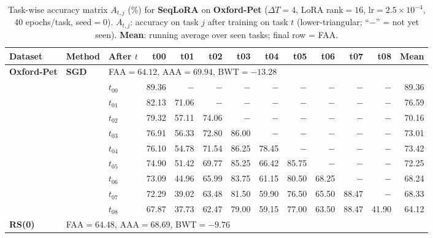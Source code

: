 
\begin{table}[ht]
\centering
\caption{%
  Task-wise accuracy matrix $A_{t,j}$ (\%) for \textbf{SeqLoRA} on \textbf{Oxford-Pet} ($\Delta T=4$, LoRA rank$=16$, lr$=2.5\times10^{-4}$, 40 epochs/task, seed$=0$).
  $A_{t,j}$: accuracy on task $j$ after training on task $t$  (lower-triangular; ``$-$'' = not yet seen).
  \textbf{Mean}: running average over seen tasks; final row = FAA.
}
\label{tab:raw_seqlora_pets}
\setlength{\tabcolsep}{2.8pt}
\renewcommand{\arraystretch}{0.88}
\scriptsize
\begin{tabular}{@{}l l l *{10}{r}@{}}
\toprule
\textbf{Dataset} & \textbf{Method} & \textbf{After $t$} & \textbf{t00} & \textbf{t01} & \textbf{t02} & \textbf{t03} & \textbf{t04} & \textbf{t05} & \textbf{t06} & \textbf{t07} & \textbf{t08} & \textbf{Mean} \\
\midrule
\multirow{10}{*}{\textbf{Oxford-Pet}} & \multirow{10}{*}{\textbf{SGD}} & \multicolumn{11}{l}{\quad\small FAA$=64.12$,\; AAA$=69.94$,\; BWT$=-13.28$} \\
 & & $t_{00}$ & 89.36 & $-$ & $-$ & $-$ & $-$ & $-$ & $-$ & $-$ & $-$ & 89.36 \\
 & & $t_{01}$ & 82.13 & 71.06 & $-$ & $-$ & $-$ & $-$ & $-$ & $-$ & $-$ & 76.59 \\
 & & $t_{02}$ & 79.32 & 57.11 & 74.06 & $-$ & $-$ & $-$ & $-$ & $-$ & $-$ & 70.16 \\
 & & $t_{03}$ & 76.91 & 56.33 & 72.80 & 86.00 & $-$ & $-$ & $-$ & $-$ & $-$ & 73.01 \\
 & & $t_{04}$ & 76.10 & 54.78 & 71.54 & 86.25 & 78.45 & $-$ & $-$ & $-$ & $-$ & 73.42 \\
 & & $t_{05}$ & 74.90 & 51.42 & 69.77 & 85.25 & 66.42 & 85.75 & $-$ & $-$ & $-$ & 72.25 \\
 & & $t_{06}$ & 73.09 & 44.96 & 65.99 & 83.75 & 61.15 & 80.50 & 68.25 & $-$ & $-$ & 68.24 \\
 & & $t_{07}$ & 72.29 & 39.02 & 63.48 & 81.50 & 59.90 & 76.50 & 65.50 & 88.47 & $-$ & 68.33 \\
 & & $t_{08}$ & 67.87 & 37.73 & 62.47 & 79.00 & 59.15 & 77.00 & 63.50 & 88.47 & 41.90 & 64.12 \\
\midrule
\multirow{10}{*}{\textbf{RS(0)}} & \multicolumn{11}{l}{\quad\small FAA$=64.48$,\; AAA$=68.69$,\; BWT$=-9.76$} \\

\end{tabular}
\end{table}
